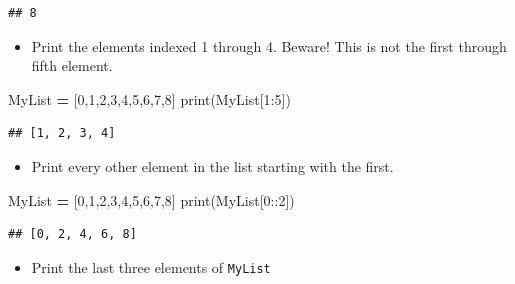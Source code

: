 \documentclass[
]{book}
\newenvironment{Shaded}{\begin{snugshade}}{\end{snugshade}}
\newcommand{\BuiltInTok}[1]{#1}
\newcommand{\DecValTok}[1]{\textcolor[rgb]{0.00,0.00,0.81}{#1}}
\newcommand{\NormalTok}[1]{#1}
\newcommand{\OperatorTok}[1]{\textcolor[rgb]{0.81,0.36,0.00}{\textbf{#1}}}
\providecommand{\tightlist}{%
  \setlength{\itemsep}{0pt}\setlength{\parskip}{0pt}}
\theoremstyle{definition}
\theoremstyle{definition}
\theoremstyle{definition}
\theoremstyle{remark}
\begin{document}
\begin{verbatim}
## 8
\end{verbatim}

\begin{itemize}
\tightlist
\item
  Print the elements indexed 1 through 4. Beware! This is not the first through fifth element.
\end{itemize}

\begin{Shaded}
\begin{Highlighting}[]
\NormalTok{MyList }\OperatorTok{=}\NormalTok{ [}\DecValTok{0}\NormalTok{,}\DecValTok{1}\NormalTok{,}\DecValTok{2}\NormalTok{,}\DecValTok{3}\NormalTok{,}\DecValTok{4}\NormalTok{,}\DecValTok{5}\NormalTok{,}\DecValTok{6}\NormalTok{,}\DecValTok{7}\NormalTok{,}\DecValTok{8}\NormalTok{] }
\BuiltInTok{print}\NormalTok{(MyList[}\DecValTok{1}\NormalTok{:}\DecValTok{5}\NormalTok{]) }
\end{Highlighting}
\end{Shaded}

\begin{verbatim}
## [1, 2, 3, 4]
\end{verbatim}

\begin{itemize}
\tightlist
\item
  Print every other element in the list starting with the first.
\end{itemize}

\begin{Shaded}
\begin{Highlighting}[]
\NormalTok{MyList }\OperatorTok{=}\NormalTok{ [}\DecValTok{0}\NormalTok{,}\DecValTok{1}\NormalTok{,}\DecValTok{2}\NormalTok{,}\DecValTok{3}\NormalTok{,}\DecValTok{4}\NormalTok{,}\DecValTok{5}\NormalTok{,}\DecValTok{6}\NormalTok{,}\DecValTok{7}\NormalTok{,}\DecValTok{8}\NormalTok{] }
\BuiltInTok{print}\NormalTok{(MyList[}\DecValTok{0}\NormalTok{::}\DecValTok{2}\NormalTok{])}
\end{Highlighting}
\end{Shaded}

\begin{verbatim}
## [0, 2, 4, 6, 8]
\end{verbatim}

\begin{itemize}
\tightlist
\item
  Print the last three elements of \texttt{MyList}
\end{itemize}
\end{document}
